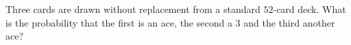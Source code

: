 Three cards are drawn without replacement from a standard $52$-card deck. What is the probability that the first is an ace, the second a $3$ and the third another ace?
